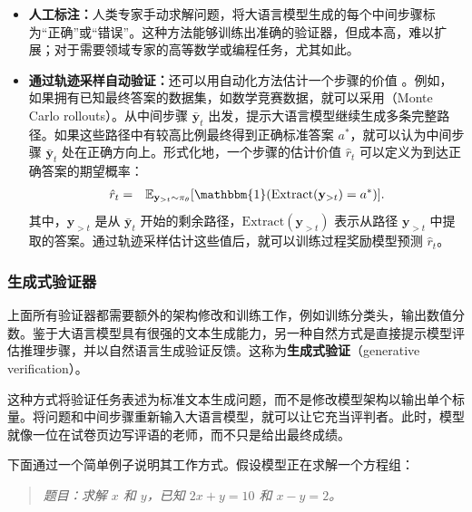 \begin{itemize}
\item \vspace{0.5em} \textbf{人工标注：}人类专家手动求解问题，将大语言模型生成的每个中间步骤标为“正确”或“错误”。这种方法能够训练出准确的验证器，但成本高，难以扩展；对于需要领域专家的高等数学或编程任务，尤其如此。
\item \vspace{0.3em} \textbf{通过轨迹采样自动验证：}还可以用自动化方法估计一个步骤的价值 \cite{wang-etal:2024math}。例如，如果拥有已知最终答案的数据集，如数学竞赛数据，就可以采用（Monte Carlo rollouts）。从中间步骤 $\bar{\mathbf{y}}_t$ 出发，提示大语言模型继续生成多条完整路径。如果这些路径中有较高比例最终得到正确标准答案 $a^*$，就可以认为中间步骤 $\bar{\mathbf{y}}_t$ 处在正确方向上。形式化地，一个步骤的估计价值 $\hat{r}_t$ 可以定义为到达正确答案的期望概率：
    \begin{eqnarray}
    \hat{r}_t & = & \mathbb{E}_{\mathbf{y}_{>t} \sim \pi_\theta} [ \mathbbm{1}(\mathrm{Extract}(\mathbf{y}_{>t}) = a^*) ].
    \end{eqnarray}
    \noindent 其中，$\mathbf{y}_{>t}$ 是从 $\bar{\mathbf{y}}_t$ 开始的剩余路径，$\mathrm{Extract}(\mathbf{y}_{>t})$ 表示从路径 $\mathbf{y}_{>t}$ 中提取的答案。通过轨迹采样估计这些值后，就可以训练过程奖励模型预测 $\hat{r}_t$。
\end{itemize}\vspace{0.5em}


\subsubsection{生成式验证器}

上面所有验证器都需要额外的架构修改和训练工作，例如训练分类头，输出数值分数。鉴于大语言模型具有很强的文本生成能力，另一种自然方式是直接提示模型评估推理步骤，并以自然语言生成验证反馈。这称为\textbf{生成式验证}（generative verification）\cite{zheng-etal:2023judging}。

这种方式将验证任务表述为标准文本生成问题，而不是修改模型架构以输出单个标量。将问题和中间步骤重新输入大语言模型，就可以让它充当评判者。此时，模型就像一位在试卷页边写评语的老师，而不只是给出最终成绩。

下面通过一个简单例子说明其工作方式。假设模型正在求解一个方程组：
\vspace{0.5em}
\begin{quote}
\textit{题目：求解 $x$ 和 $y$，已知 $2x + y = 10$ 和 $x - y = 2$。}
\end{quote}
\vspace{0.5em}

